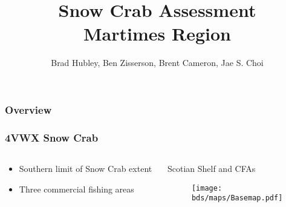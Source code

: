\documentclass{beamer}
\title[Snow Crab Assessment \yr]{Snow Crab Assessment\\  Martimes Region\\ \yr }
\author[Hubley, Zisserson, Cameron, Choi]{Brad Hubley, Ben Zisserson, Brent Cameron, Jae S. Choi}
\institute[DFO Science]{
  Canadian Department of Fisheries and Oceans \\ %
  Science Branch \\
  Population Ecology Division
  \medskip
  \textit{} %
}
\numberwithin{equation}{section}		%
\numberwithin{figure}{section}	   	%
\numberwithin{table}{section}				%
\newcommand{\bd}{\string~/bio.data}   %
\newcommand{\bds}{\bd/bio.snowcrab}
\begin{document}
  \begin{frame}
    \titlepage %
  \end{frame}
  

  \begin{frame}
    \frametitle{Overview} %
    \tableofcontents %
  \end{frame}
  
  
  \begin{frame}
    \frametitle{4VWX Snow Crab}
    \begin{columns}[T]
      \begin{column}{0.4\textwidth}
        \begin{itemize}
          \item Southern limit of Snow Crab extent
          \item Three commercial fishing areas
        \end{itemize}
      \end{column}
      
      \begin{column}{0.6\textwidth}
        \begin{centering}
          Scotian Shelf and CFAs
          \begin{figure}
            \texttt{[image: \\bds/maps/Basemap.pdf]}
          \end{figure}
        \end{centering}
      \end{column}
    \end{columns}
  \end{frame}
  
  
\end{document}
